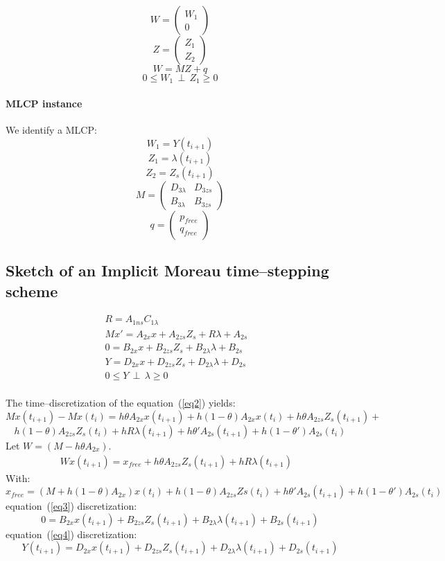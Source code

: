 \[W=\left(\begin{array}{c}W_{1}\\0\end{array}\right)\]
\[Z=\left(\begin{array}{c}Z_{1}\\Z_{2}\end{array}\right)\]
\[W=MZ+q\]
\[0 \leq W_{1} \, \perp \, Z_{1} \geq 0\]
\paragraph{MLCP instance}
We identify a MLCP:\\
\[W_{1} = Y(t_{i+1})\]
\[Z_{1} = \lambda(t_{i+1})\]
\[Z_{2} = Z_{s}(t_{i+1})\]
\[M = \left(\begin{array}{cc}
  D_{3\lambda}&D_{3zs}\\
B_{3\lambda}&B_{3zs}
\end{array}\right)\]
\[q=\left(\begin{array}{c}
p_{free}\\
q_{free}\end{array}\right)\]
\newpage

\subsection{Sketch of an Implicit Moreau time--stepping scheme}
\begin{eqnarray}
R=A_{1ns}C_{1\lambda}\label{eq1}\\
Mx'=A_{2x}x +A_{2zs}Z_{s} +R \lambda +A_{2s}&\label{eq2}\\
0=B_{2x}x+B_{2zs}Z_{s} + B_{2\lambda}\lambda + B_{2s}&\label{eq3}\\
Y=D_{2x}x+D_{2zs}Z_{s}+D_{2\lambda}\lambda + D_{2s} &\label{eq4}\\
0 \leq Y \, \perp \, \lambda \geq 0&\label{eqperp}\\
\end{eqnarray}


 The time--discretization of the equation~(\ref{eq2}) yields:
\[Mx(t_{i+1}) - Mx(t_{i})=h\theta A_{2x}x(t_{i+1})+h(1-\theta)A_{2x}x(t_{i}) +h\theta
A_{2zs}Z_{s}(t_{i+1}) +\]
\[h(1-\theta)A_{2zs}Z_s(t_{i}) +hR\lambda (t_{i+1}) + h\theta 'A_{2s}(t_{i+1}) +
h(1-\theta ')A_{2s}(t_{i})\]
Let $W=(M-h\theta A_{2x}) .$
\begin{eqnarray}
Wx(t_{i+1})=x_{free}+h\theta A_{2zs}Z_{s}(t_{i+1})+hR\lambda (t_{i+1}) &\label{eq5}
\end{eqnarray}
With:
\[x_{free}=(M+h(1-\theta)A_{2x})x(t_{i}) + h(1-\theta )A_{2zs}Zs(t_{i}) + h\theta 'A_{2s}(t_{i+1}) +
h(1-\theta ')A_{2s}(t_{i})\]
equation~(\ref{eq3}) discretization:
\[0 = B_{2x}x(t_{i+1})+B_{2zs}Z_{s}(t_{i+1}) + B_{2\lambda}\lambda(t_{i+1})+B_{2s}(t_{i+1})\]
equation~(\ref{eq4}) discretization:
\[Y(t_{i+1})=D_{2x}x(t_{i+1})+D_{2zs}Z_{s}(t_{i+1}) +D_{2\lambda}\lambda(t_{i+1})+D_{2s}(t_{i+1})\]

